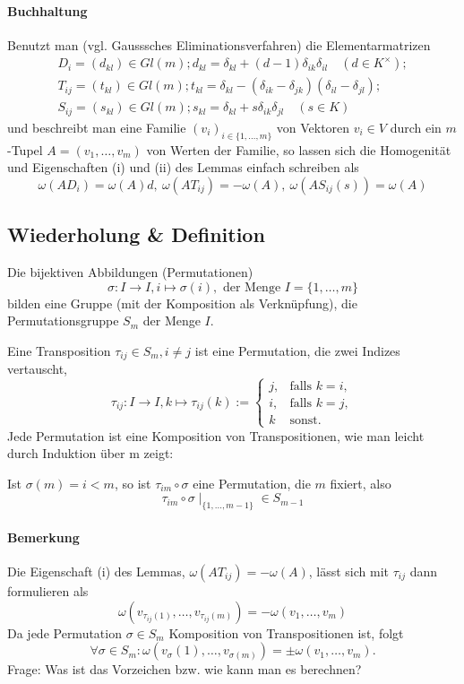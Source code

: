 \paragraph{Buchhaltung}
	Benutzt man (vgl. Gausssches Eliminationsverfahren) die Elementarmatrizen
	\begin{gather*}
		D_i = (d_{kl}) \in Gl(m); d_{kl} = \delta_{kl}+(d-1)\delta_{ik}\delta_{il}\quad (d\in K^\times);\\
		T_{ij} = (t_{kl}) \in Gl(m); t_{kl} = \delta_{kl}-(\delta_{ik}-\delta_{jk})(\delta_{il}-\delta_{jl});\\
		S_{ij} = (s_{kl})\in Gl(m); s_{kl}=\delta_{kl}+s\delta_{ik}\delta_{jl}\quad (s\in K)
	\end{gather*}
	und beschreibt man eine Familie $ (v_i)_{i\in \{1,\dots,m\}} $ von Vektoren $ v_i\in V $ durch ein $ m $-Tupel $ A=(v_1,\dots,v_m) $ von Werten der Familie, so lassen sich die Homogenität und Eigenschaften (i) und (ii) des Lemmas einfach schreiben als
		\[ \omega(AD_i) = \omega(A)d,\ \omega(AT_{ij}) = -\omega(A),\ \omega(AS_{ij}(s)) = \omega(A) \]
\subsection{Wiederholung \& Definition}
	Die bijektiven Abbildungen (Permutationen)
		\[ \sigma: I\to I, i\mapsto \sigma(i),\text{ der Menge }I = \{1,\dots,m\} \]
	bilden eine Gruppe (mit der Komposition als Verknüpfung), die Permutationsgruppe $ S_m $ der Menge $ I $.
	\begin{Definition}[Transposition]
	Eine Transposition $ \tau_{ij} \in S_m, i\neq j $ ist eine Permutation, die zwei Indizes vertauscht,
		\[ \tau_{ij}:I\to I, k\mapsto \tau_{ij}(k):=
		\begin{cases}
			j, &\text{falls } k=i,\\
			i, &\text{falls } k=j,\\
			k & \text{sonst}.
		\end{cases} \]
	Jede Permutation ist eine Komposition von Transpositionen, wie man leicht durch Induktion über m zeigt:
	
	Ist $ \sigma(m) = i<m$, so ist $ \tau_{im}\circ \sigma $ eine Permutation, die $ m $ fixiert, also
		\[ \tau_{im}\circ\sigma\mid_{\{1,\dots,m-1\}}\in S_{m-1} \]
	\end{Definition}
\paragraph{Bemerkung}
	Die Eigenschaft (i) des Lemmas, $ \omega(AT_{ij})=-\omega(A) $, lässt sich mit $ \tau_{ij} $ dann formulieren als
		\[ \omega(v_{\tau_{ij}(1)}, \dots, v_{\tau_{ij}(m)}) = - \omega(v_1,\dots,v_m) \]
	Da jede Permutation $ \sigma\in S_m $ Komposition von Transpositionen ist, folgt
		\[ \forall \sigma\in S_m: \omega(v_{\sigma}(1),\dots,v_{\sigma(m)})=\pm \omega(v_1,\dots,v_{m}). \]
	Frage: Was ist das Vorzeichen bzw. wie kann man es berechnen?
